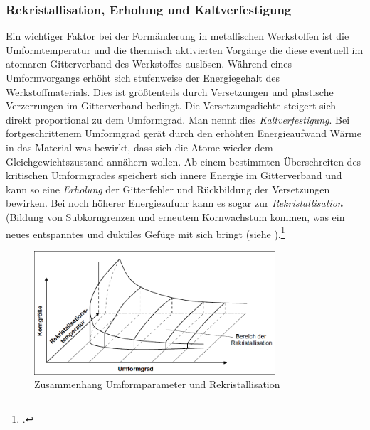 \documentclass[12pt,a4paper,parskip]{scrartcl}
\begin{document}
{\subsubsection{Rekristallisation, Erholung und Kaltverfestigung}
Ein wichtiger Faktor bei der Formänderung in metallischen Werkstoffen ist die Umformtemperatur und die thermisch aktivierten Vorgänge die diese eventuell im atomaren Gitterverband des Werkstoffes auslösen. Während eines Umformvorgangs erhöht sich stufenweise der Energiegehalt des Werkstoffmaterials. Dies ist größtenteils durch Versetzungen und plastische Verzerrungen im Gitterverband bedingt. Die Versetzungsdichte steigert sich direkt proportional zu dem Umformgrad. Man nennt dies \emph{Kaltverfestigung}. Bei fortgeschrittenem Umformgrad gerät durch den erhöhten Energieaufwand Wärme in das Material was bewirkt, dass sich die Atome wieder dem Gleichgewichtszustand annähern wollen. Ab einem bestimmten Überschreiten des kritischen Umformgrades speichert sich innere Energie im Gitterverband und kann so eine \emph{Erholung} der Gitterfehler und Rückbildung der Versetzungen bewirken. Bei noch höherer Energiezufuhr kann es sogar zur \emph{Rekristallisation} (Bildung von Subkorngrenzen und erneutem Kornwachstum kommen, was ein neues entspanntes und duktiles Gefüge mit sich bringt (siehe ).\footcite[Vgl.][11-13]{fu}
\begin{figure}
\centering
\includegraphics[width=0.8\textwidth]{rekristall}
\caption[Zusammenhang Umformparameter und Rekristallisation]{Zusammenhang Umformparameter und Rekristallisation\protect\footnotemark}
\label{fig:rekristall}
\end{figure}






}
\end{document}
